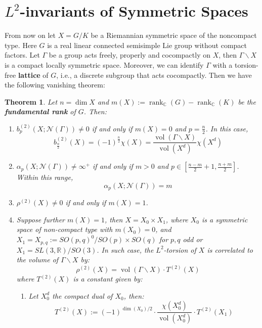 \documentclass[11pt]{report}
\theoremstyle{definition}
\theoremstyle{plain}
\newtheorem{Theo}[Def]{Theorem}
\DeclareMathOperator{\vol}{vol}
\DeclareMathOperator{\rk}{rank}
\newcommand{\real}{\mathbb{R}}
\newcommand{\complex}{\mathbb{C}}
\newcommand{\vna}{\mathcal{N}}
\begin{document}
\section{$L^2$-invariants of Symmetric Spaces}
From now on let $X=G/K$ be a Riemannian symmetric space of the noncompact type. Here $G$ is a real linear connected semisimple Lie group without compact factors. Let $\Gamma$ be a group acts freely, properly and cocompactly  on $X$, then $\Gamma\backslash X$ is a compact locally symmetric space. Moreover, we can identify $\Gamma$ with a torsion-free \textbf{lattice} of $G$, i.e., a discrete subgroup that acts cocompactly. Then we have the following vanishing theorem:
\begin{Theo}\label{olbrich1.1}
	\textnormal{\cite{olbrich2002}} Let $n=\dim X$ and $m(X):=\rk_\complex(G)-\rk_\complex(K)$ be the \textbf{fundamental rank} of $G$. Then:
	\begin{enumerate}[label*={\Roman*}]
		\item $b_p^{(2)}(X; \vna(\Gamma))\neq 0$ if and only if $m(X)=0$ and $p=\frac{n}{2}$. In this case,
		\begin{equation}
		b^{(2)}_{\frac{n}{2}}(X)=(-1)^{\frac{n}{2}}\chi(X)=\frac{\vol(\Gamma\backslash X)}{\vol(X^d)}\chi(X^d)
		\end{equation}
		\item $\alpha_p(X; \vna(\Gamma))\neq \infty^+$ if and only if $m>0$ and $p\in [\frac{n-m}{2}+1, \frac{n+m}{2}]$. Within this range, 
		\begin{equation}
		\alpha_p(X; \vna(\Gamma))=m
		\end{equation}
		\item $\rho^{(2)}(X)\neq 0$ if and only if $m(X)=1$.
		\item Suppose further $m(X)=1$, then $X=X_0\times X_1$, where $X_0$ is a symmetric space of non-compact type with $m(X_0)=0$, and $X_1=X_{p,q}:=SO(p,q)^0/SO(p)\times SO(q)$ for $p,q$ odd or $X_1=SL(3, \real)/SO(3)$. In such case, the $L^2$-torsion of $X$ is correlated to the volume of $\Gamma\backslash X$ by:
		\begin{equation}
		\rho^{(2)}(X)=\vol(\Gamma\backslash X)\cdot T^{(2)}(X)
		\end{equation}
		where $T^{(2)}(X)$ is a constant given by:
		\begin{enumerate}
			\item Let $X^d_0$ the compact dual of $X_0$, then:
			\begin{equation}
			T^{(2)}(X):=(-1)^{\dim(X_0)/2}\cdot \frac{\chi(X^d_0)}{\vol(X_0^d)}\cdot T^{(2)}(X_1)

\end{equation}
\end{enumerate}
\end{enumerate}
\end{Theo}
\end{document}
